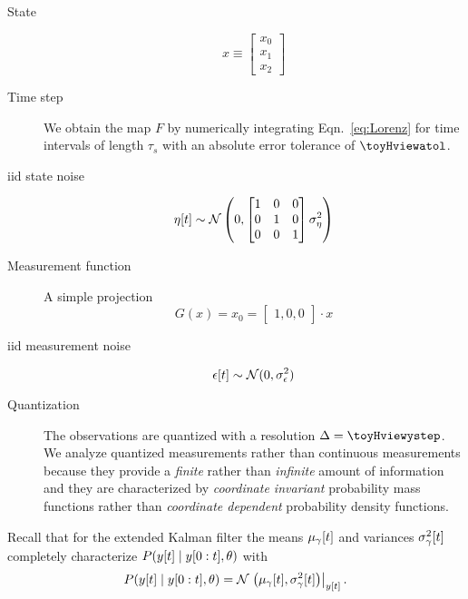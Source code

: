   \begin{description}
  \item[State] 
    \begin{equation*}
      x \equiv 
      \begin{bmatrix}
        x_0\\x_1\\x_2
      \end{bmatrix}
    \end{equation*}
  \item[Time step] We obtain the map $F$ by numerically integrating
    Eqn.~\eqref{eq:Lorenz} for time intervals of length $\tau_s$ with an
    absolute error tolerance of $\toyHviewatol$.
  \item[iid state noise] 
    \begin{equation*}
      {\eta}{[t]} \sim {\mathcal{N}}\left(0, \begin{bmatrix} 1 & 0 & 0\\0 & 1 &
        0\\0&0&1 \end{bmatrix} \sigma_\eta^2\right)
    \end{equation*}
  \item[Measurement function] A simple projection
    \begin{equation*}
      G(x) = x_0 = \begin{bmatrix} 1,0,0 \end{bmatrix} \cdot x
    \end{equation*}
  \item[iid measurement noise] 
    \begin{equation*}
      {\epsilon}{[t]} \sim {\mathcal{N}}(0, \sigma_\epsilon^2)
    \end{equation*}
  \item[Quantization] The observations are quantized with a resolution
    $\Delta=\toyHviewystep$.  We analyze quantized measurements rather than
    continuous measurements because they provide a \emph{finite} rather
    than \emph{infinite} amount of information and they are
    characterized by \emph{coordinate invariant} probability mass
    functions rather than \emph{coordinate dependent} probability
    density functions.
\end{description}
Recall that for the extended Kalman filter the means
${\mu_\gamma}{[t]}$ and variances ${\sigma^2_\gamma}{[t]}$ completely
characterize $ P({y}{[t]}\mid y[0:t],\theta)$ with
\begin{equation*}
  P({y}{[t]}\mid y[0:t],\theta) =
  {\mathcal{N}}\left.\left({\mu_\gamma}{[t]},{\sigma^2_\gamma}{[t]}\right)\right|_{{y}{[t]}}.
\end{equation*}
